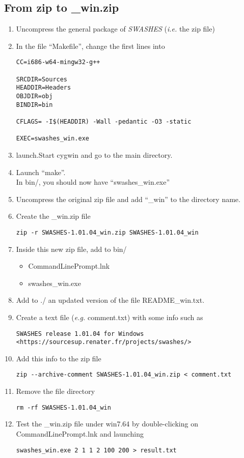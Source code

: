 \documentclass[a4paper, 11pt]{article}
\newcommand{\SWASHES}{\emph{SWASHES}}
\begin{document}
\subsection{From zip to \_win.zip}
\begin{enumerate}
\item Uncompress the general package of \SWASHES{} (\emph{i.e.} the zip file)
\item In the file ``Makefile'', change the first lines into
\begin{verbatim}
CC=i686-w64-mingw32-g++

SRCDIR=Sources
HEADDIR=Headers
OBJDIR=obj
BINDIR=bin

CFLAGS= -I$(HEADDIR) -Wall -pedantic -O3 -static

EXEC=swashes_win.exe
\end{verbatim}
\item launch.Start cygwin and go to the main directory.
\item Launch ``make''.\\
In bin/, you should now have ``swashes\_win.exe''
\item Uncompress the original zip file and add ``\_win'' to the directory name.
\item Create the \_win.zip file
\begin{verbatim}
zip -r SWASHES-1.01.04_win.zip SWASHES-1.01.04_win
\end{verbatim}
\item Inside this new zip file, add to bin/
	\begin{itemize}
		\item CommandLinePrompt.lnk
		\item swashes\_win.exe
	\end{itemize}
\item Add to ./ an updated version of the file README\_win.txt.
\item Create a text file (\emph{e.g.} comment.txt) with some info such as
\begin{verbatim}
SWASHES release 1.01.04 for Windows
<https://sourcesup.renater.fr/projects/swashes/>
\end{verbatim}
\item Add this info to the zip file
\begin{verbatim}
zip --archive-comment SWASHES-1.01.04_win.zip < comment.txt
\end{verbatim}
\item Remove the file directory
\begin{verbatim}
rm -rf SWASHES-1.01.04_win
\end{verbatim}

\item Test the \_win.zip file under win7.64 by
double-clicking on CommandLinePrompt.lnk and launching
\begin{verbatim}
swashes_win.exe 2 1 1 2 100 200 > result.txt
\end{verbatim}
\end{enumerate}
\end{document}
